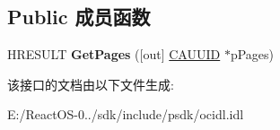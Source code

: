 \subsection*{Public 成员函数}
\begin{DoxyCompactItemize}
\item 
\mbox{\label{interface_i_specify_property_pages_aa676dfd8e951992eaa4a86c34501bdda}} 
H\+R\+E\+S\+U\+LT {\bfseries Get\+Pages} (\mbox{[}out\mbox{]} \hyperlink{struct_i_specify_property_pages_1_1tag_c_a_u_u_i_d}{C\+A\+U\+U\+ID} $\ast$p\+Pages)
\end{DoxyCompactItemize}


该接口的文档由以下文件生成\+:\begin{DoxyCompactItemize}
\item 
E\+:/\+React\+O\+S-\/0../sdk/include/psdk/ocidl.\+idl\end{DoxyCompactItemize}
